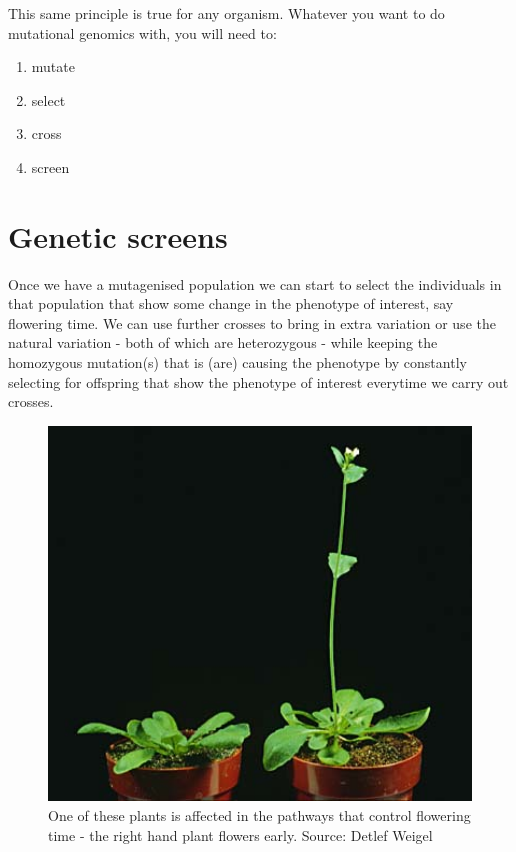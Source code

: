 \documentclass[12pt,]{book}
\providecommand{\tightlist}{%
  \setlength{\itemsep}{0pt}\setlength{\parskip}{0pt}}
\theoremstyle{definition}
\theoremstyle{definition}
\theoremstyle{remark}
\begin{document}
This same principle is true for any organism. Whatever you want to do
mutational genomics with, you will need to:

\begin{enumerate}
\def\labelenumi{\arabic{enumi}.}
\tightlist
\item
  mutate
\item
  select
\item
  cross
\item
  screen
\end{enumerate}

\section{Genetic screens}\label{genetic-screens}

Once we have a mutagenised population we can start to select the
individuals in that population that show some change in the phenotype of
interest, say flowering time. We can use further crosses to bring in
extra variation or use the natural variation - both of which are
heterozygous - while keeping the homozygous mutation(s) that is (are)
causing the phenotype by constantly selecting for offspring that show
the phenotype of interest everytime we carry out crosses.





\begin{figure}
\includegraphics[width=5.47in]{assets/tall_plant} \caption{One of these plants is affected in the pathways that
control flowering time - the right hand plant flowers early. Source:
Detlef Weigel}\label{fig:tallplant}
\end{figure}
\end{document}
